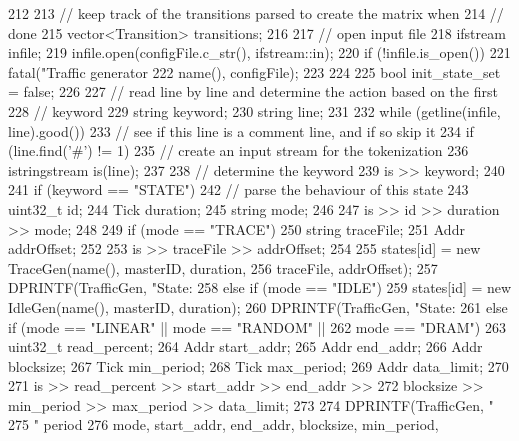 \begin{DoxyCode}
212 {
213     // keep track of the transitions parsed to create the matrix when
214     // done
215     vector<Transition> transitions;
216 
217     // open input file
218     ifstream infile;
219     infile.open(configFile.c_str(), ifstream::in);
220     if (!infile.is_open()) {
221         fatal("Traffic generator %
222               name(), configFile);
223     }
224 
225     bool init_state_set = false;
226 
227     // read line by line and determine the action based on the first
228     // keyword
229     string keyword;
230     string line;
231 
232     while (getline(infile, line).good()) {
233         // see if this line is a comment line, and if so skip it
234         if (line.find('#') != 1) {
235             // create an input stream for the tokenization
236             istringstream is(line);
237 
238             // determine the keyword
239             is >> keyword;
240 
241             if (keyword == "STATE") {
242                 // parse the behaviour of this state
243                 uint32_t id;
244                 Tick duration;
245                 string mode;
246 
247                 is >> id >> duration >> mode;
248 
249                 if (mode == "TRACE") {
250                     string traceFile;
251                     Addr addrOffset;
252 
253                     is >> traceFile >> addrOffset;
254 
255                     states[id] = new TraceGen(name(), masterID, duration,
256                                               traceFile, addrOffset);
257                     DPRINTF(TrafficGen, "State: %
258                 } else if (mode == "IDLE") {
259                     states[id] = new IdleGen(name(), masterID, duration);
260                     DPRINTF(TrafficGen, "State: %
261                 } else if (mode == "LINEAR" || mode == "RANDOM" ||
262                            mode == "DRAM") {
263                     uint32_t read_percent;
264                     Addr start_addr;
265                     Addr end_addr;
266                     Addr blocksize;
267                     Tick min_period;
268                     Tick max_period;
269                     Addr data_limit;
270 
271                     is >> read_percent >> start_addr >> end_addr >>
272                         blocksize >> min_period >> max_period >> data_limit;
273 
274                     DPRINTF(TrafficGen, "%
275                             " period %
276                             mode, start_addr, end_addr, blocksize, min_period,
}}}}}
\end{DoxyCode}

